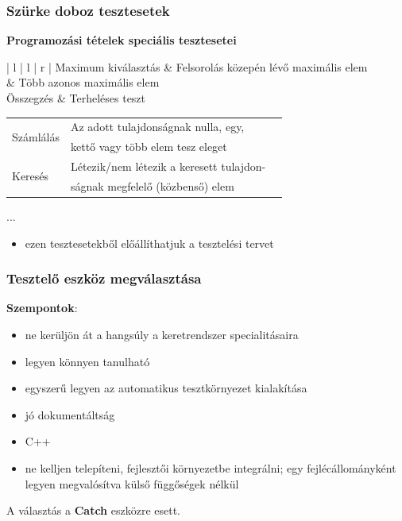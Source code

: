 \documentclass[11pt]{beamer}
\begin{document}
\begin{frame}
	\frametitle{Szürke doboz tesztesetek}
	\textbf{Programozási tételek speciális tesztesetei}
		
	\begin{center}
		\begin{tabular}{ | l | l | r | }
			\hline
			{Maximum kiválasztás} & Felsorolás közepén lévő maximális elem \hspace*{-1px}\\
			& Több azonos maximális elem \\
			\hline
			Összegzés & Terheléses teszt \\
			\hline
		\end{tabular}
	\end{center}
	
		\begin{center}
			\begin{tabular}{ | l | l | r | }
				\hline
				\multirow{2}{100px}{Számlálás}
				& Az adott tulajdonságnak nulla, egy, \\
				& kettő vagy több elem tesz eleget\\
				\hline
				\multirow{2}{100px}{Keresés}
				& Létezik/nem létezik a keresett tulajdon- \\
				& ságnak megfelelő (közbenső) elem\\
				\hline
			\end{tabular}
		\end{center}
		...
	
	\begin{itemize}
		\item ezen tesztesetekből előállíthatjuk a tesztelési tervet
	\end{itemize}
\end{frame}


\begin{frame}
	\frametitle{Tesztelő eszköz megválasztása}
	\textbf{Szempontok}:
	\begin{itemize}
		\item ne kerüljön át a hangsúly a keretrendszer specialitásaira
		\vspace*{2px}
		\item legyen könnyen tanulható
		\vspace*{2px}
		\item egyszerű legyen az automatikus tesztkörnyezet kialakítása
		\vspace*{2px}
		\item jó dokumentáltság
		\vspace*{2px}
		\item C++
		\vspace*{2px}
		\item ne kelljen telepíteni, fejlesztői környezetbe integrálni; egy fejlécállományként legyen megvalósítva külső függőségek nélkül 
		
	\end{itemize}\pause
	\vspace*{15px}
	A választás a \textbf{Catch} eszközre esett.
\end{frame}
\end{document}
